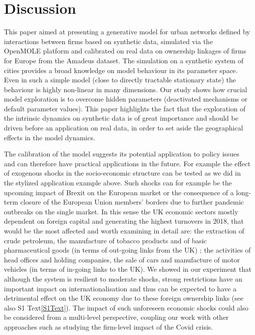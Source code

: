 \documentclass[10pt,letterpaper]{article}
\begin{document}
\section*{Discussion}

This paper aimed at presenting a generative model for urban networks defined by interactions between firms based on synthetic data, simulated via the OpenMOLE platform and calibrated on real data on ownership linkages of firms for Europe from the Amadeus dataset. The simulation on a synthetic system of cities provides a broad knowledge on model behaviour in its parameter space. Even in such a simple model (close to directly tractable stationary state) the behaviour is highly non-linear in many dimensions. Our study shows how crucial model exploration is to overcome hidden parameters (deactivated mechanisms or default parameter values). This paper highlights the fact that the exploration of the intrinsic dynamics on synthetic data is of great importance and should be driven before an application on real data, in order to set aside the geographical effects in the model dynamics.

The calibration of the model suggests its potential application to policy issues and can therefore have practical applications in the future. For example the effect of exogenous shocks in the socio-economic structure can be tested as we did in the stylized application example above. Such shocks can for example be the upcoming impact of Brexit on the European market or the consequence of a long-term closure of the European Union members' borders due to further pandemic outbreaks on the single market. In this sense the UK economic sectors mostly dependent on foreign capital and generating the highest turnovers in 2018, that would be the most affected and worth examining in detail are: the extraction of crude petroleum, the manufacture of tobacco products and of basic pharmaceutical goods (in terms of out-going links from the UK) ; the activities of head offices and holding companies, the sale of cars and manufacture of motor vehicles (in terms of in-going links to the UK). We showed in our experiment that although the system is resilient to moderate shocks, strong restrictions have an important impact on internationalisation and thus can be expected to have a detrimental effect on the UK economy due to these foreign ownership links (see also S1 Text\ref{S1Text}). The impact of such unforeseen economic shocks could also be considered from a multi-level perspective, coupling our work with other approaches such as \cite{Dorretal2022} studying the firm-level impact of the Covid crisis.
\end{document}
